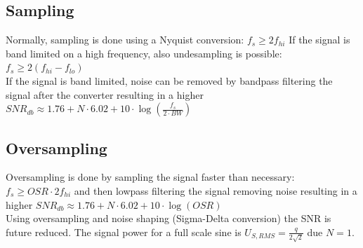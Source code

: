 \subsection{Sampling}
Normally, sampling is done using a Nyquist conversion: $f_s \geq 2f_{hi}$ If the signal is band limited on a high frequency, also undesampling is possible: $f_s \geq 2(f_{hi}-f_{lo})$\\
If the signal is band limited, noise can be removed by bandpass filtering the signal after the converter resulting in a higher $SNR_{db} \approx 1.76 + N \cdot 6.02 + 10 \cdot \log(\frac{f_s}{2 \cdot BW}) $\\

\subsection{Oversampling}
Oversampling is done by sampling the signal faster than necessary: $f_s \geq OSR \cdot 2f_{hi}$ and then lowpass filtering the signal removing noise resulting in a higher $SNR_{db} \approx 1.76 + N \cdot 6.02 + 10 \cdot \log(OSR) $\\

Using oversampling and noise shaping (Sigma-Delta conversion) the SNR is future reduced. The signal power for a full scale sine is $U_{S,RMS} = \frac{q}{2\sqrt{2}}$ due $N = 1$.\\


